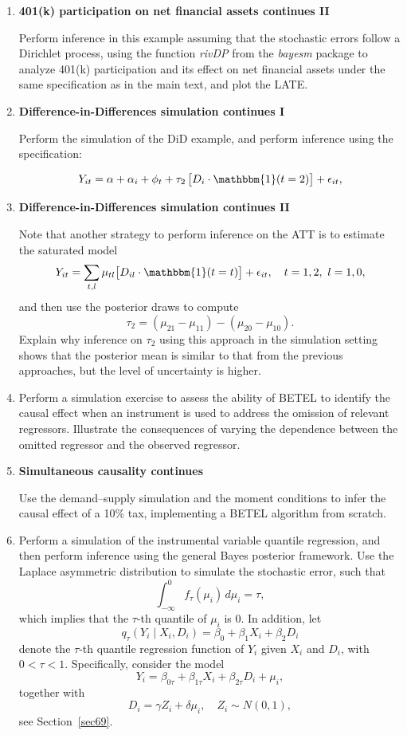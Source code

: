 \begin{enumerate}
	\item \textbf{401(k) participation on net financial assets continues II} 
	
	Perform inference in this example assuming that the stochastic errors follow a Dirichlet process, using the function \textit{rivDP} from the \textit{bayesm} package to analyze 401(k) participation and its effect on net financial assets under the same specification as in the main text, and plot the LATE.
	
	\item \textbf{Difference-in-Differences simulation continues I}
	
	Perform the simulation of the DiD example, and perform inference using the specification:
	
	\[
	Y_{it} = \alpha + \alpha_i + \phi_t + \tau_2 \,\big[ D_i \cdot \mathbbm{1}(t = 2) \big] + \epsilon_{it},
	\]
	
	\item \textbf{Difference-in-Differences simulation continues II}
	
	Note that another strategy to perform inference on the ATT is to estimate the saturated model
	\[
	Y_{it} = \sum_{t,l} \mu_{tl} \big[ D_{il} \cdot \mathbbm{1}(t = t) \big] + \epsilon_{it}, \quad t = 1, 2, \ l = 1, 0,
	\]
	and then use the posterior draws to compute
	\[
	\tau_2 = (\mu_{21} - \mu_{11}) - (\mu_{20} - \mu_{10}).
	\]
	Explain why inference on $\tau_2$ using this approach in the simulation setting shows that the posterior mean is similar to that from the previous approaches, but the level of uncertainty is higher.
	
	\item Perform a simulation exercise to assess the ability of BETEL to identify the causal effect when an instrument is used to address the omission of relevant regressors. Illustrate the consequences of varying the dependence between the omitted regressor and the observed regressor.
	
	\item \textbf{Simultaneous causality continues}
	
	Use the demand–supply simulation and the moment conditions to infer the causal effect of a	10\% tax, implementing a BETEL algorithm from scratch.
	
	\item Perform a simulation of the instrumental variable quantile regression, and then perform inference using the general Bayes posterior framework. Use the Laplace asymmetric distribution to simulate the stochastic error, such that 
	\[
	\int_{-\infty}^{0} f_{\tau}(\mu_i) \, d\mu_i = \tau,
	\] 
	which implies that the $\tau$-th quantile of $\mu_i$ is 0. In addition, let 
	\[
	q_{\tau}(Y_i \mid X_i, D_i) = \beta_0 + \beta_1 X_i + \beta_2 D_i
	\] 
	denote the $\tau$-th quantile regression function of $Y_i$ given $X_i$ and $D_i$, with $0 < \tau < 1$. Specifically, consider the model
	\[
	Y_i = \beta_{0\tau} + \beta_{1\tau} X_i + \beta_{2\tau} D_i + \mu_i,
	\]
	together with 
	\[
	D_i = \gamma Z_i + \delta \mu_i, \quad Z_i \sim N(0,1),
	\]
	see Section~\ref{sec69}.
	

\end{enumerate}
